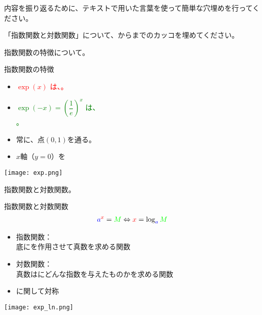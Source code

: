 \documentclass[uplatex,dvipdfmx,a4paper,11pt]{jsarticle}
\begin{document}
内容を振り返るために、テキストで用いた言葉を使って簡単な穴埋めを行ってください。
\begin{qlist}
	\qitem 「指数関数と対数関数」について、からまでのカッコを埋めてください。
		\begin{qlist2}
			\qitem 指数関数の特徴について。
			\begin{center}
				\begin{minipage}{0.42\textwidth}
					\begin{itembox}[l]{指数関数の特徴}
						\begin{itemize}
							\item \textcolor{red}{$\exp (x)$ は、\qbox{}。}
							\item \textcolor{green}{$\exp (-x) = \left(\dfrac{1}{e} \right)^x$ は、\\\qbox{}。}
							\item 常に、点$(0,1)$を通る。
							\item $x$軸（$y=0$）を\qbox{}
						\end{itemize}
					\end{itembox}
				\end{minipage}
				\begin{minipage}{0.42\textwidth}
					\begin{center}
					\texttt{[image: exp.png]}
					\end{center}
				\end{minipage}
			\end{center}
			
			\qitem 指数関数と対数関数。
			\begin{center}
				\begin{minipage}{0.42\textwidth}
					\begin{itembox}[l]{指数関数と対数関数}
						\vspace{-3mm}
						\begin{align*}
							\textcolor{blue}{a}^{\textcolor{red}{x}} = \textcolor{green}{M} \Leftrightarrow \textcolor{red}{x}= \log_{\textcolor{blue}{a}} \textcolor{green}{M}
						\end{align*}
						\begin{itemize}
							\item 指数関数：\\底に\qbox{}を作用させて真数を求める関数
							\item 対数関数：\\真数は\qbox{}にどんな指数を与えたものかを求める関数
							\item \qbox{}に関して対称
						\end{itemize}
					\end{itembox}
				\end{minipage}
				\begin{minipage}{0.42\textwidth}
					\begin{center}
					\texttt{[image: exp\_ln.png]}
					\end{center}
				\end{minipage}
			\end{center}


\end{qlist2}
\end{qlist}
\end{document}
